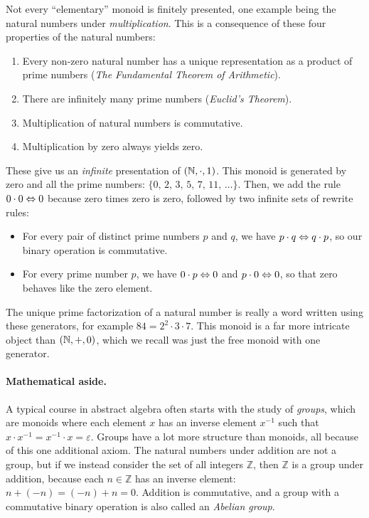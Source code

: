 \documentclass[../generics]{subfiles}
\begin{document}
\begin{example}
Not every ``elementary'' monoid is finitely presented, one example being the natural numbers under \emph{multiplication}. This is a consequence of these four properties of the natural numbers:
\begin{enumerate}
\item Every non-zero natural number has a unique representation as a product of prime numbers (\emph{The Fundamental Theorem of Arithmetic}).
\item There are infinitely many prime numbers (\emph{Euclid's Theorem}).
\item Multiplication of natural numbers is commutative.
\item Multiplication by zero always yields zero.
\end{enumerate}
These give us an \emph{infinite} presentation of $(\mathbb{N},\cdot,1)$. This monoid is generated by zero and all the prime numbers: $\{0,\,2,\,3,\,5,\,7,\,11,\,\ldots\}$. Then, we add the rule $0\cdot 0\Leftrightarrow 0$ because zero times zero is zero, followed by two infinite sets of rewrite rules:
\begin{itemize}
\item For every pair of distinct prime numbers $p$ and $q$, we have $p\cdot q\Leftrightarrow q\cdot p$, so our binary operation is commutative.
\item For every prime number $p$, we have $0\cdot p\Leftrightarrow 0$ and $p\cdot 0\Leftrightarrow 0$, so that zero behaves like  the zero element.
\end{itemize}
The unique prime factorization of a natural number is really a word written using these generators, for example $84=2^2\cdot 3\cdot 7$. This monoid is a far more intricate object than $(\mathbb{N},+,0)$, which we recall was just the free monoid with one generator.
\end{example}

\paragraph{Mathematical aside.}
A typical course in abstract algebra often starts with the study of \emph{groups}, which are monoids where each element $x$ has an inverse element $x^{-1}$ such that $x\cdot x^{-1}=x^{-1}\cdot x=\varepsilon$. Groups have a lot more structure than monoids, all because of this one additional axiom. The natural numbers under addition are not a group, but if we instead consider the set of all integers $\mathbb{Z}$, then $\mathbb{Z}$ is a group under addition, because each $n\in\mathbb{Z}$ has an inverse element: $n+(-n)=(-n)+n=0$. Addition is commutative, and a group with a commutative binary operation is also called an \emph{Abelian group}.
\end{document}
